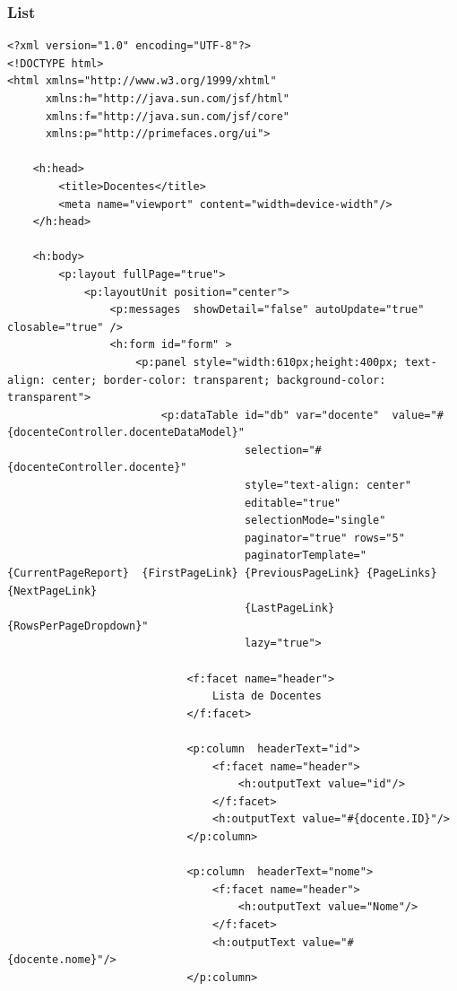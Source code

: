 \documentclass[12pt,a4paper]{article}
\begin{document}
\subsubsection{List}
\label{subsubsectionDocenteList}
\begin{lstlisting}
<?xml version="1.0" encoding="UTF-8"?>
<!DOCTYPE html>
<html xmlns="http://www.w3.org/1999/xhtml"
      xmlns:h="http://java.sun.com/jsf/html"
      xmlns:f="http://java.sun.com/jsf/core"
      xmlns:p="http://primefaces.org/ui">

    <h:head>
        <title>Docentes</title>
        <meta name="viewport" content="width=device-width"/>
    </h:head>

    <h:body>
        <p:layout fullPage="true">
            <p:layoutUnit position="center">
                <p:messages  showDetail="false" autoUpdate="true" closable="true" />
                <h:form id="form" >
                    <p:panel style="width:610px;height:400px; text-align: center; border-color: transparent; background-color: transparent">  
                        <p:dataTable id="db" var="docente"  value="#{docenteController.docenteDataModel}"
                                     selection="#{docenteController.docente}"
                                     style="text-align: center" 
                                     editable="true"
                                     selectionMode="single"
                                     paginator="true" rows="5"  
                                     paginatorTemplate="{CurrentPageReport}  {FirstPageLink} {PreviousPageLink} {PageLinks} {NextPageLink} 
                                     {LastPageLink} {RowsPerPageDropdown}"
                                     lazy="true">  

                            <f:facet name="header">  
                                Lista de Docentes
                            </f:facet>  

                            <p:column  headerText="id">
                                <f:facet name="header">
                                    <h:outputText value="id"/>
                                </f:facet>
                                <h:outputText value="#{docente.ID}"/>
                            </p:column>

                            <p:column  headerText="nome">  
                                <f:facet name="header">
                                    <h:outputText value="Nome"/>
                                </f:facet>
                                <h:outputText value="#{docente.nome}"/>
                            </p:column> 


\end{lstlisting}
\end{document}
